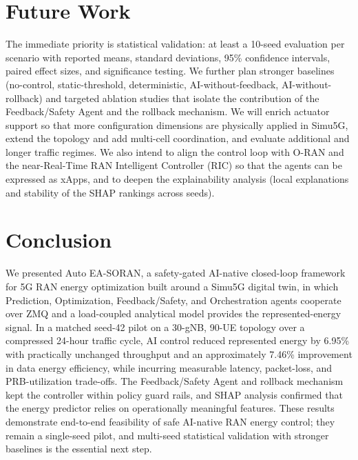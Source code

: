 \documentclass[conference]{IEEEtran}
\begin{document}
\section{Future Work}
The immediate priority is statistical validation: at least a 10-seed evaluation per scenario with reported means, standard deviations, 95\% confidence intervals, paired effect sizes, and significance testing. We further plan stronger baselines (no-control, static-threshold, deterministic, AI-without-feedback, AI-without-rollback) and targeted ablation studies that isolate the contribution of the Feedback/Safety Agent and the rollback mechanism. We will enrich actuator support so that more configuration dimensions are physically applied in Simu5G, extend the topology and add multi-cell coordination, and evaluate additional and longer traffic regimes. We also intend to align the control loop with O-RAN and the near-Real-Time RAN Intelligent Controller (RIC) so that the agents can be expressed as xApps, and to deepen the explainability analysis (local explanations and stability of the SHAP rankings across seeds).

\section{Conclusion}
We presented Auto EA-SORAN, a safety-gated AI-native closed-loop framework for 5G RAN energy optimization built around a Simu5G digital twin, in which Prediction, Optimization, Feedback/Safety, and Orchestration agents cooperate over ZMQ and a load-coupled analytical model provides the represented-energy signal. In a matched seed-42 pilot on a 30-gNB, 90-UE topology over a compressed 24-hour traffic cycle, AI control reduced represented energy by 6.95\% with practically unchanged throughput and an approximately 7.46\% improvement in data energy efficiency, while incurring measurable latency, packet-loss, and PRB-utilization trade-offs. The Feedback/Safety Agent and rollback mechanism kept the controller within policy guard rails, and SHAP analysis confirmed that the energy predictor relies on operationally meaningful features. These results demonstrate end-to-end feasibility of safe AI-native RAN energy control; they remain a single-seed pilot, and multi-seed statistical validation with stronger baselines is the essential next step.
\end{document}
